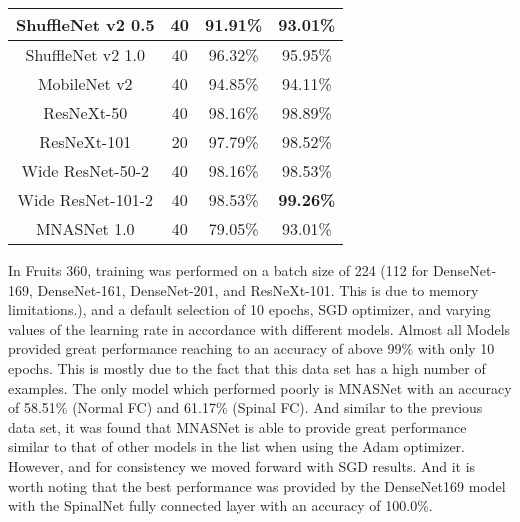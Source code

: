 \documentclass[conference]{IEEEtran}
\begin{document}
\begin{table}
\begin{tabular}{|c|c|c|c|}
    \hline ShuffleNet v2 0.5 & 40  & 91.91\%   & 93.01\% \\
    \hline ShuffleNet v2 1.0 & 40  & 96.32\%   & 95.95\% \\
    \hline MobileNet v2 & 40 & 94.85\%  & 94.11\% \\
    \hline ResNeXt-50   & 40 & 98.16\%  & 98.89\% \\
    \hline ResNeXt-101  & 20 & 97.79\%  & 98.52\% \\
    \hline Wide ResNet-50-2  & 40 & 98.16\% & 98.53\% \\
    \hline Wide ResNet-101-2 & 40 & 98.53\% & \textbf{99.26\%} \\
    \hline MNASNet 1.0       & 40 & 79.05\% & 93.01\% \\
    \hline
\end{tabular} 
\end{table}

In Fruits 360, training was performed on a batch size of 224 (112 for DenseNet-169, DenseNet-161, DenseNet-201, and ResNeXt-101. This is due to memory limitations.), and a default selection of 10 epochs, SGD optimizer, and varying values of the learning rate in accordance with different models. Almost all Models provided great performance reaching to an accuracy of above 99\% with only 10 epochs. This is mostly due to the fact that this data set has a high number of examples. The only model which performed poorly is MNASNet with an accuracy of 58.51\% (Normal FC) and 61.17\% (Spinal FC). And similar to the previous data set, it was found that MNASNet is able to provide great performance similar to that of other models in the list when using the Adam optimizer. However, and for consistency we moved forward with SGD results. And it is worth noting that the best performance was provided by the DenseNet169 model with the SpinalNet fully connected layer with an accuracy of 100.0\%.
\end{document}
